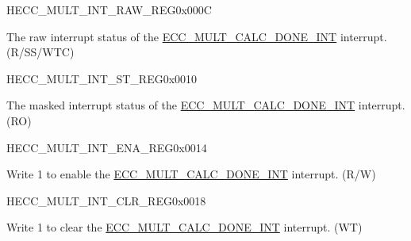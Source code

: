 \begin{register}{H}{ECC\_MULT\_INT\_RAW\_REG}{0x000C}\label{regdesc:ECCMULTINTRAWREG}
%
%
\regnewline%
\begin{regdesc}\begin{reglist}
\label{fielddesc:ECCMULTCALCDONEINTRAW}\item [ECC\_MULT\_CALC\_DONE\_INT\_RAW] The raw interrupt status of the \hyperref[int:ECCMULTCALCDONEINT]{ECC\_MULT\_CALC\_DONE\_INT} interrupt. (R/SS/WTC)
\end{reglist}\end{regdesc}
\end{register}


\begin{register}{H}{ECC\_MULT\_INT\_ST\_REG}{0x0010}\label{regdesc:ECCMULTINTSTREG}
%
%
\regnewline%
\begin{regdesc}\begin{reglist}
\label{fielddesc:ECCMULTCALCDONEINTST}\item [ECC\_MULT\_CALC\_DONE\_INT\_ST] The masked interrupt status of the \hyperref[int:ECCMULTCALCDONEINT]{ECC\_MULT\_CALC\_DONE\_INT} interrupt. (RO)
\end{reglist}\end{regdesc}
\end{register}


\begin{register}{H}{ECC\_MULT\_INT\_ENA\_REG}{0x0014}\label{regdesc:ECCMULTINTENAREG}
%
%
\regnewline%
\begin{regdesc}\begin{reglist}
\label{fielddesc:ECCMULTCALCDONEINTENA}\item [ECC\_MULT\_CALC\_DONE\_INT\_ENA] Write 1 to enable the \hyperref[int:ECCMULTCALCDONEINT]{ECC\_MULT\_CALC\_DONE\_INT} interrupt. (R/W)
\end{reglist}\end{regdesc}
\end{register}


\begin{register}{H}{ECC\_MULT\_INT\_CLR\_REG}{0x0018}\label{regdesc:ECCMULTINTCLRREG}
%
%
\regnewline%
\begin{regdesc}\begin{reglist}
\label{fielddesc:ECCMULTCALCDONEINTCLR}\item [ECC\_MULT\_CALC\_DONE\_INT\_CLR] Write 1 to clear the \hyperref[int:ECCMULTCALCDONEINT]{ECC\_MULT\_CALC\_DONE\_INT} interrupt. (WT)
\end{reglist}\end{regdesc}
\end{register}


